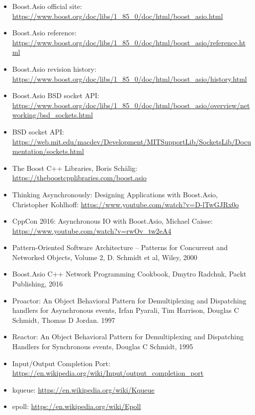 \begin{itemize}
\item
Boost.Asio official site: \url{https://www.boost.org/doc/libs/1_85_0/doc/html/boost_asio.html}

\item
Boost.Asio reference: \url{https://www.boost.org/doc/libs/1_85_0/doc/html/boost_asio/reference.html}

\item
Boost.Asio revision history: \url{https://www.boost.org/doc/libs/1_85_0/doc/html/boost_asio/history.html}

\item
Boost.Asio BSD socket API: \url{https://www.boost.org/doc/libs/1_85_0/doc/html/boost_asio/overview/networking/bsd_sockets.html}

\item
BSD socket API: \url{https://web.mit.edu/macdev/Development/MITSupportLib/SocketsLib/Documentation/sockets.html}

\item
The Boost C++ Libraries, Boris Schälig: \url{https://theboostcpplibraries.com/boost.asio}

\item
Thinking Asynchronously: Designing Applications with Boost.Asio, Christopher Kohlhoff: \url{https://www.youtube.com/watch?v=D-lTwGJRx0o}

\item
CppCon 2016: Asynchronous IO with Boost.Asio, Michael Caisse: \url{https://www.youtube.com/watch?v=rwOv_tw2eA4}

\item
Pattern-Oriented Software Architecture – Patterns for Concurrent and Networked Objects, Volume 2, D. Schmidt et al, Wiley, 2000

\item
Boost.Asio C++ Network Programming Cookbook, Dmytro Radchuk, Packt Publishing, 2016

\item
Proactor: An Object Behavioral Pattern for Demultiplexing and Dispatching handlers for Asynchronous events, Irfan Pyarali, Tim Harrison, Douglas C Schmidt, Thomas D Jordan. 1997

\item
Reactor: An Object Behavioral Pattern for Demultiplexing and Dispatching Handlers for Synchronous events, Douglas C Schmidt, 1995

\item
Input/Output Completion Port: \url{https://en.wikipedia.org/wiki/Input/output_completion_port}

\item
kqueue: \url{https://en.wikipedia.org/wiki/Kqueue}

\item
epoll: \url{https://en.wikipedia.org/wiki/Epoll}
\end{itemize}